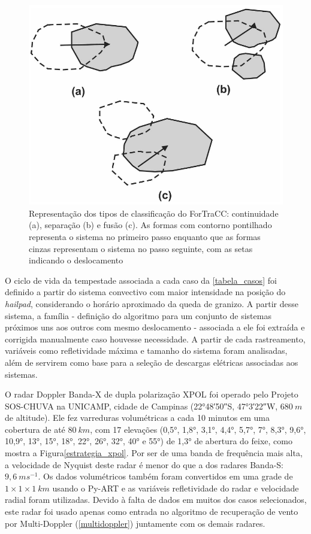 \begin{figure}[htb]
	\begin{center}
		\caption{Representação dos tipos de classificação do ForTraCC: continuidade (a), separação (b) e fusão (c). As formas com contorno pontilhado representa o sistema no primeiro passo enquanto que as formas cinzas representam o sistema no passo seguinte, com as setas indicando o deslocamento} 
		\label{fortracc_teoria}
		\includegraphics[width=0.5\columnwidth]{figs/fortracc_classes.png}
	\end{center}
\end{figure}

O ciclo de vida da tempestade associada a cada caso da \autoref{tabela_casos} foi definido a partir do sistema convectivo com maior intensidade na posição do \textit{hailpad}, considerando o horário aproximado da queda de granizo. A partir desse sistema, a família - definição do algoritmo para um conjunto de sistemas próximos uns aos outros com mesmo deslocamento - associada a ele foi extraída e corrigida manualmente caso houvesse necessidade. A partir de cada rastreamento, variáveis como refletividade máxima e tamanho do sistema foram analisadas, além de servirem como base para a seleção de descargas elétricas associadas aos sistemas.

O radar Doppler Banda-X de dupla polarização XPOL foi operado pelo Projeto SOS-CHUVA na UNICAMP, cidade de Campinas (\ang{22;48;50}\:S, \ang{47;3;22}\:W, $680\:m$ de altitude). Ele fez varreduras volumétricas a cada 10 minutos em uma cobertura de até $80\:km$, com 17 elevações (\ang{0,5}, \ang{1,8}, \ang{3,1}, \ang{4,4}, \ang{5,7}, \ang{7}, \ang{8,3}, \ang{9,6}, \ang{10,9}, \ang{13}, \ang{15}, \ang{18}, \ang{22}, \ang{26}, \ang{32}, \ang{40} e \ang{55}) de \ang{1,3} de abertura do feixe, como mostra a Figura\autoref{estrategia_xpol}. Por ser de uma banda de frequência mais alta, a velocidade de Nyquist deste radar é menor do que a dos radares Banda-S: $9,6\:ms^{-1}$. Os dados volumétricos também foram convertidos em uma grade de $1 \times 1 \times 1\:km$ usando o Py-ART \cite{Helmus2016} e as variáveis refletividade do radar e velocidade radial foram utilizadas. Devido à falta de dados em muitos dos casos selecionados, este radar foi usado apenas como entrada no algoritmo de recuperação de vento por Multi-Doppler (\autoref{multidoppler}) juntamente com os demais radares.

